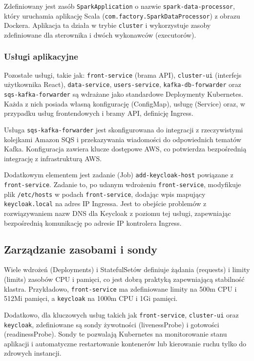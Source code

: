Zdefiniowany jest zasób \texttt{SparkApplication} o nazwie \texttt{spark-data-processor}, który uruchamia aplikację Scala (\texttt{com.factory.SparkDataProcessor}) z obrazu Dockera. Aplikacja ta działa w trybie \texttt{cluster} i wykorzystuje zasoby zdefiniowane dla sterownika i dwóch wykonawców (executorów).

\subsubsection{Usługi aplikacyjne}
Pozostałe usługi, takie jak: \texttt{front-service} (brama API), \texttt{cluster-ui} (interfejs użytkownika React), \texttt{data-service}, \texttt{users-service}, \texttt{kafka-db-forwarder} oraz \texttt{sqs-kafka-forwarder} są wdrażane jako standardowe Deploymenty Kubernetes. Każda z nich posiada własną konfigurację (ConfigMap), usługę (Service) oraz, w przypadku usług frontendowych i bramy API, definicję Ingress.

Usługa \texttt{sqs-kafka-forwarder} jest skonfigurowana do integracji z rzeczywistymi kolejkami Amazon SQS i przekazywania wiadomości do odpowiednich tematów Kafka. Konfiguracja zawiera klucze dostępowe AWS, co potwierdza bezpośrednią integrację z infrastrukturą AWS.

Dodatkowym elementem jest zadanie (Job) \texttt{add-keycloak-host} powiązane z \texttt{front-service}. Zadanie to, po udanym wdrożeniu \texttt{front-service}, modyfikuje plik \texttt{/etc/hosts} w podach \texttt{front-service}, dodając wpis mapujący \texttt{keycloak.local} na adres IP Ingressa. Jest to obejście problemów z rozwiązywaniem nazw DNS dla Keycloak z poziomu tej usługi, zapewniając bezpośrednią komunikację po adresie IP kontrolera Ingress.

\subsection{Zarządzanie zasobami i sondy}

Wiele wdrożeń (Deployments) i StatefulSetów definiuje żądania (requests) i limity (limits) zasobów CPU i pamięci, co jest dobrą praktyką zapewniającą stabilność klastra. Przykładowo, \texttt{front-service} ma zdefiniowane limity na 500m CPU i 512Mi pamięci, a \texttt{keycloak} na 1000m CPU i 1Gi pamięci.

Dodatkowo, dla kluczowych usług takich jak \texttt{front-service}, \texttt{cluster-ui} oraz \texttt{keycloak}, zdefiniowane są sondy żywotności (livenessProbe) i gotowości (readinessProbe). Sondy te pozwalają Kubernetes na monitorowanie stanu aplikacji i automatyczne restartowanie kontenerów lub kierowanie ruchu tylko do zdrowych instancji.
